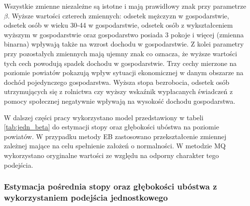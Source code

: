 Wszystkie zmienne niezależne są istotne i mają prawidłowy znak przy parametrze $\beta$. Wyższe wartości czterech zmiennych: odsetek mężczyzn w gospodarstwie, odsetek osób w wieku 30-44 w gospodarstwie, odsetek osób z wykształceniem wyższym w gospodarstwie oraz gospodarstwo posiada 3 pokoje i więcej (zmienna binarna) wpływają także na wzrost dochodu w gospodarstwie. Z kolei parametry przy pozostałych zmiennych mają ujemny znak co oznacza, że wyższe wartości tych cech powodują spadek dochodu w gospodarstwie. Trzy cechy mierzone na poziomie powiatów pokazują wpływ sytuacji ekonomicznej w danym obszarze na dochód pojedynczego gospodarstwa. Wyższa stopa bezrobocia, odsetek osób utrzymujących się z rolnictwa czy wyższy wskaźnik wypłacanych świadczeń z pomocy społecznej negatywnie wpływają na wysokość dochodu gospodarstwa.

%
%

W dalszej części pracy wykorzystano model przedstawiony w tabeli \ref{tab:jedn_beta} do estymacji stopy oraz głębokości ubóstwa na poziomie powiatów. W przypadku metody EB zastosowano przekształcenie zmiennej zależnej mające na celu spełnienie założeń o normalności. W metodzie MQ wykorzystano oryginalne wartości ze względu na odporny charakter tego podejścia.

\subsubsection{Estymacja pośrednia stopy oraz głębokości ubóstwa z wykorzystaniem podejścia jednostkowego}

